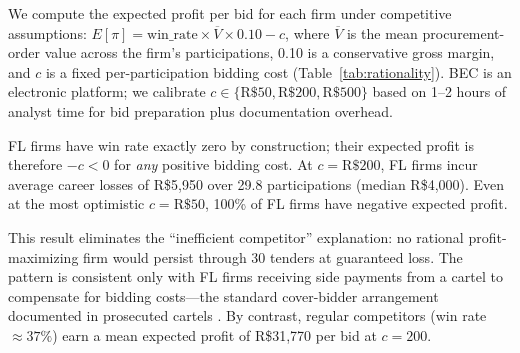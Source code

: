 We compute the expected profit per bid for each firm under
competitive assumptions: $E[\pi] = \text{win\_rate} \times
\overline{V} \times 0.10 - c$, where $\overline{V}$ is the mean
procurement-order value across the firm's participations, 0.10 is a
conservative gross margin, and $c$ is a fixed per-participation
bidding cost (Table~\ref{tab:rationality}). BEC is an electronic
platform; we calibrate $c \in \{\text{R\$50}, \text{R\$200},
\text{R\$500}\}$ based on 1--2 hours of analyst time for bid
preparation plus documentation overhead.

FL firms have win rate exactly zero by construction; their expected
profit is therefore $-c < 0$ for \emph{any} positive bidding cost.
At $c = \text{R\$200}$, FL firms incur average career losses of
R\$5,950 over 29.8 participations (median R\$4,000). Even at the
most optimistic $c = \text{R\$50}$, 100\% of FL firms have negative
expected profit.

This result eliminates the ``inefficient competitor'' explanation:
no rational profit-maximizing firm would persist through 30 tenders
at guaranteed loss. The pattern is consistent only with FL firms
receiving side payments from a cartel to compensate for bidding
costs---the standard cover-bidder arrangement documented in
prosecuted cartels \citep{asker2010leniency, marshall2012economics}.
By contrast, regular competitors (win rate $\approx 37\%$) earn a
mean expected profit of R\$31,770 per bid at $c = 200$.




